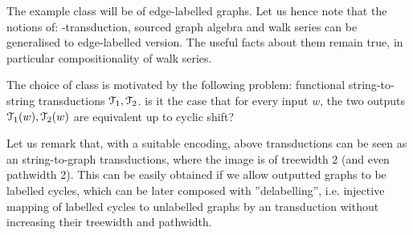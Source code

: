 The example class will be of edge-labelled graphs. Let us hence note that the notions of: \mso-transduction, sourced graph algebra and walk series can be generalised to edge-labelled version. The useful facts about them remain true, in particular compositionality of walk series.

The choice of class is motivated by the following problem: 
	{functional string-to-string \mso transductions ${\mathcal T}_1,{\mathcal T}_2$.}
	{is it the case that for every input $w$, the two outputs  ${\mathcal T}_1(w),{\mathcal T}_2(w)$ are equivalent up to cyclic shift?}
\iffalse
\mso string-to-string transductions can be defined by string-to-($\Sigma^*, \cdot$) register transducers (fill-in reference), and in consequence, when considered modulo cyclic shift-equivalence, they can be seen as string-to-\algcyclic register transducers, where \algcyclic is the following (sorted) algebra: (fill-in czy używać sortów. Są one przydatne też przy dowodzie kompozycjonalności szeregu ścieżkowego, ale sam nie jestem przekonany)
\algebradefinition{
	$\algcyclic_1$: (sort 1 ) words of positive length over alphabet $\Sigma$,\\
	$\algcyclic_0$: (sort 0 ) cyclic words of positive length, labelled by alphabet $\Sigma$.
}
{
	$\cdot : \algcyclic_1 \times \algcyclic_1 \to \algcyclic_1$ - concatenation of words.\\
	$\cyclic:\algcyclic_1 \to \algcyclic_0$ - maps a word to cyclic word it represents.\\
}
\fi
Let us remark that, with a suitable encoding, above transductions can be seen as an \mso string-to-graph transductions, where the image is of treewidth 2 (and even pathwidth 2). This can be easily obtained if we allow outputted graphs to be labelled cycles, which can be later composed with ''delabelling'', i.e. injective mapping of labelled cycles to unlabelled graphs by an \mso transduction without increasing their treewidth and pathwidth. %
